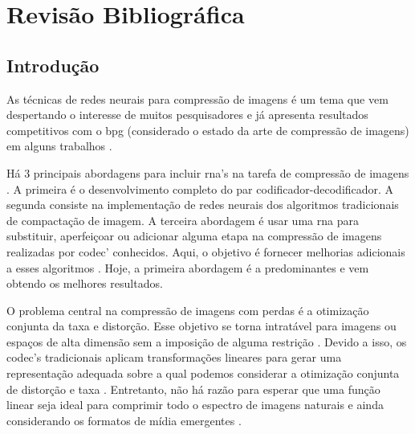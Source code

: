 \chapter{Revisão Bibliográfica}

\section{Introdução}

As técnicas de redes neurais para compressão de imagens é um tema que vem despertando o interesse de muitos pesquisadores e já apresenta resultados competitivos com o \acrshort{bpg} (considerado o estado da arte de compressão de imagens) em alguns trabalhos \cite{Priming2017Johnston,Autoregressive2018Minnen,akbari2019dsslic}. 

Há 3 principais abordagens para incluir \acrshort{rna}'s na tarefa de compressão de imagens \cite{Jiang1999}. A primeira é o desenvolvimento completo do par codificador-decodificador. A segunda consiste na implementação de redes neurais dos algoritmos tradicionais de compactação de imagem. A terceira abordagem é usar uma \acrshort{rna} para substituir, aperfeiçoar ou adicionar alguma etapa na compressão de imagens realizadas por \acrshort{codec}' conhecidos. Aqui, o objetivo é fornecer melhorias adicionais a esses algoritmos \cite{Jiang1999}. Hoje, a primeira abordagem é a predominantes e vem obtendo os melhores resultados.

O problema central na compressão de imagens com perdas é a otimização conjunta da taxa e distorção. Esse objetivo se torna intratável para imagens ou espaços de alta dimensão sem a imposição de alguma restrição \cite{gersho2012vector}. Devido a isso, os \acrshort{codec}'s tradicionais aplicam transformações lineares para gerar uma representação adequada sobre a qual podemos considerar a otimização conjunta de distorção e taxa \cite{End2016Balle}. Entretanto, não há razão para esperar que uma função linear seja ideal para comprimir todo o espectro de imagens naturais e ainda considerando os formatos de mídia emergentes \cite{santurkar2018generative}.  

